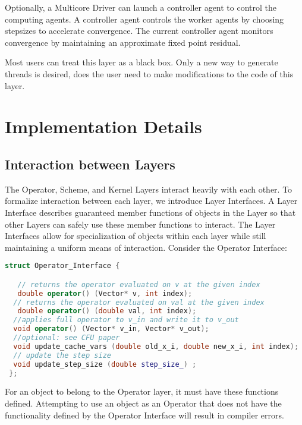 Optionally, a Multicore Driver can launch a controller agent to control the computing agents.
A controller agent controls the worker agents by choosing stepsizes to accelerate convergence.
The current controller agent monitors convergence by maintaining an approximate fixed point residual.

Most users can treat this layer as a black box. Only a new way to generate threads is desired, does the user need to make modifications to the code of this layer.

\section{Implementation Details}\label{sc:implement}

\subsection{Interaction between Layers}

The Operator, Scheme, and Kernel Layers interact heavily with each other. To formalize interaction between each layer, we introduce Layer Interfaces. A Layer Interface describes guaranteed member functions of objects in the Layer so that other Layers can safely use these member functions to interact. The Layer Interfaces allow for specialization of objects within each layer while still maintaining a uniform means of interaction. Consider the Operator Interface:
\begin{lstlisting}[language=C++,label={Operator_Interface}]
struct Operator_Interface {

   // returns the operator evaluated on v at the given index
   double operator() (Vector* v, int index);
  // returns the operator evaluated on val at the given index
   double operator() (double val, int index);
  //applies full operator to v_in and write it to v_out
  void operator() (Vector* v_in, Vector* v_out);
  //optional: see CFU paper
  void update_cache_vars (double old_x_i, double new_x_i, int index);
  // update the step size
  void update_step_size (double step_size_) ;
 };
\end{lstlisting}

For an object to belong to the Operator layer, it must have these functions defined.
Attempting to use an object as an Operator that does not have the functionality defined by the Operator Interface will result in compiler errors.

